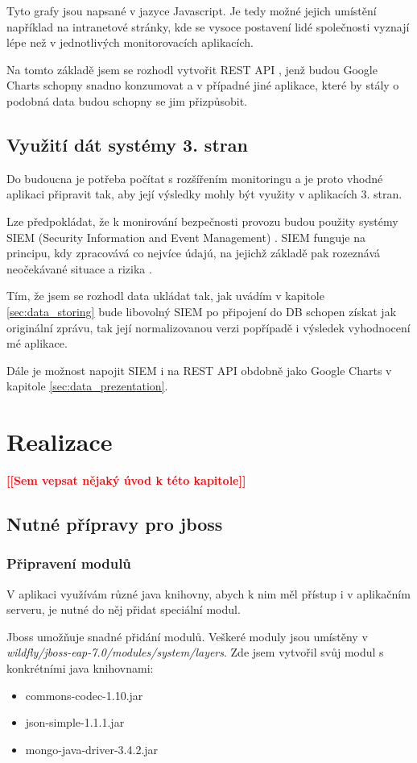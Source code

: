\documentclass[thesis=M,czech]{FITthesis}[2012/10/20]
\newcommand{\todo}[1]{\textcolor{red}{\textbf{[[#1]]}}}
\begin{document}
		Tyto grafy jsou napsané v jazyce Javascript. Je tedy možné jejich umístění například na intranetové stránky, kde se vysoce postavení lidé společnosti vyznají lépe než v jednotlivých monitorovacích aplikacích.
		
		Na tomto základě jsem se rozhodl vytvořit REST API \cite{rest}, jenž budou Google Charts schopny snadno konzumovat a v případné jiné aplikace, které by stály o podobná data budou schopny se jim přizpůsobit.
		
	\section{Využití dát systémy 3. stran}
		Do budoucna je potřeba počítat s rozšířením monitoringu a je proto vhodné aplikaci připravit tak, aby její výsledky mohly být využity v aplikacích 3. stran.
		
		Lze předpokládat, že k monirování bezpečnosti provozu budou použity systémy SIEM (Security Information and Event Management) \cite{siem}.
		SIEM funguje na principu, kdy zpracovává co nejvíce údajú, na jejichž základě pak rozeznává neočekávané situace a rizika \cite{howDesSiemWork}.
		
		Tím, že jsem se rozhodl data ukládat tak, jak uvádím v kapitole \ref{sec:data_storing} bude libovolný SIEM po připojení do DB schopen získat jak originální zprávu, tak její normalizovanou verzi popřípadě i výsledek vyhodnocení mé aplikace.
		
		Dále je možnost napojit SIEM i na REST API obdobně jako Google Charts v kapitole \ref{sec:data_prezentation}.
		
\chapter{Realizace}
	\todo{Sem vepsat nějaký úvod k této kapitole}
	
	\section{Nutné přípravy pro jboss}
		\subsection{Připravení modulů}
		V aplikaci využívám různé java knihovny, abych k nim měl přístup i v aplikačním serveru, je nutné do něj přidat speciální modul.
		
		Jboss umožňuje snadné přidání modulů. Veškeré moduly jsou umístěny v \textit{wildfly/jboss-eap-7.0/modules/system/layers}. Zde jsem vytvořil svůj modul s konkrétními java knihovnami:
		\begin{itemize} 
			\item commons-codec-1.10.jar
			\item json-simple-1.1.1.jar
			\item mongo-java-driver-3.4.2.jar		
		\end{itemize}
		
\end{document}

